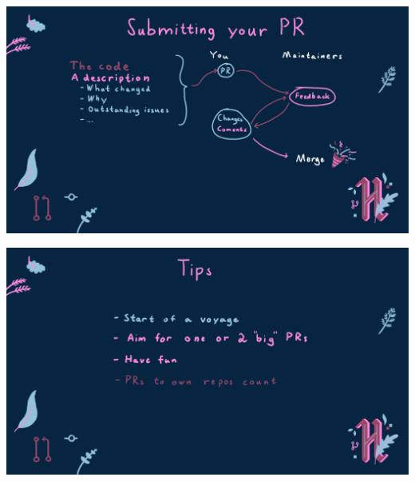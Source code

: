 \documentclass[aspectratio=169]{beamer}
\begin{document}
\begin{frame}[plain]
    \includegraphics[width=\textwidth]{slide7.png}
\end{frame}
\begin{frame}[plain]
    \includegraphics[width=\textwidth]{slide8.png}
\end{frame}
\end{document}
